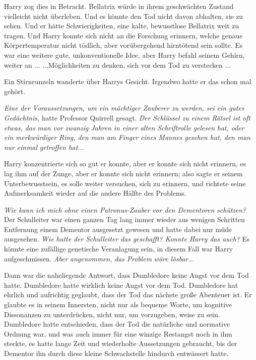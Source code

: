Harry zog dies in Betracht. Bellatrix würde in ihrem geschwächten Zustand
vielleicht nicht überleben. Und es könnte den Tod nicht davon abhalten, sie zu
sehen. Und er hätte Schwierigkeiten, eine kalte, bewusstlose Bellatrix weit zu
tragen. Und Harry konnte sich nicht an die Forschung erinnern, welche genaue
Körpertemperatur nicht tödlich, aber vorübergehend hirntötend sein sollte. Es
war eine weitere gute, unkonventionelle Idee, aber Harry befahl seinem Gehirn,
weiter an ... ...Möglichkeiten zu denken, sich vor dem Tod zu verstecken ...

Ein Stirnrunzeln wanderte über Harrys Gesicht. Irgendwo hatte er das schon mal
gehört.

\emph{Eine der Voraussetzungen, um ein mächtiger Zauberer zu werden, sei ein
gutes Gedächtnis,} hatte Professor Quirrell gesagt.\emph{ Der Schlüssel zu einem
Rätsel ist oft etwas, das man vor zwanzig Jahren in einer alten Schriftrolle
gelesen hat, oder ein merkwürdiger Ring, den man am Finger eines Mannes gesehen
hat, den man nur einmal getroffen hat.}..

Harry konzentrierte sich so gut er konnte, aber er konnte sich nicht erinnern,
es lag ihm auf der Zunge, aber er konnte sich nicht erinnern; also sagte er
seinem Unterbewusstsein, es solle weiter versuchen, sich zu erinnern, und
richtete seine Aufmerksamkeit wieder auf die andere Hälfte des Problems.

\emph{Wie kann ich mich ohne einen Patronus-Zauber vor den Dementoren schützen?}
Der Schulleiter war einen ganzen Tag lang immer wieder aus wenigen Schritten
Entfernung einem Dementor ausgesetzt gewesen und hatte dabei nur müde
ausgesehen. \emph{Wie hatte der Schulleiter das geschafft? Konnte Harry das
auch?} Es könnte eine zufällige genetische Veranlagung sein, in diesem Fall war
Harry aufgeschmissen. \emph{Aber angenommen, das Problem wäre lösbar.}..

Dann war die naheliegende Antwort, dass Dumbledore keine Angst vor dem Tod
hatte. Dumbledore hatte wirklich keine Angst vor dem Tod. Dumbledore hat ehrlich
und aufrichtig geglaubt, dass der Tod das nächste große Abenteuer ist. Er
glaubte es in seinem Innersten, nicht nur als bequeme Worte, um kognitive
Dissonanzen zu unterdrücken, nicht nur, um vorzugeben, weise zu sein. Dumbledore
hatte entschieden, dass der Tod die natürliche und normative Ordnung war, und
was auch immer für eine winzige Restangst noch in ihm steckte, es hatte lange
Zeit und wiederholte Aussetzungen gebraucht, bis der Dementor ihn durch diese
kleine Schwachstelle hindurch entwässert hatte.

